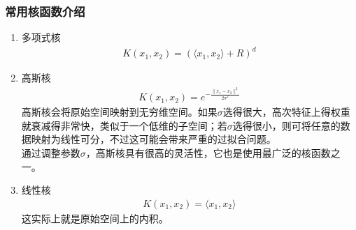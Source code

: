\subsubsection{常用核函数介绍}
\begin{enumerate}
	\item 多项式核
	\begin{align}
		K(x_1, x_2) = \left(\langle x_1, x_2 \rangle + R\right)^d
	\end{align}
	\item 高斯核
	\begin{align}
		K(x_1, x_2) = e^{-\frac{\|x_1 - x_2\|^2}{2\sigma^2}}
	\end{align}
	高斯核会将原始空间映射到无穷维空间。如果$\sigma$选得很大，高次特征上得权重就衰减得非常快，类似于一个低维的子空间；若$\sigma$选得很小，则可将任意的数据映射为线性可分，不过这可能会带来严重的过拟合问题。\\
	通过调整参数$\sigma$，高斯核具有很高的灵活性，它也是使用最广泛的核函数之一。
	\item 线性核
	\begin{align}
		K(x_1, x_2) = \langle x_1, x_2 \rangle
	\end{align}
	这实际上就是原始空间上的内积。
\end{enumerate}

